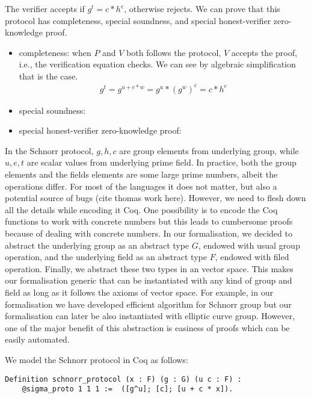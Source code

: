 \documentclass[conference,compsoc]{IEEEtran}
\begin{document}
The verifier accepts if $g^t = c * h^e$, otherwise rejects. We can prove that 
this protocol has completeness, special soundness, and special honest-verifier 
zero-knowledge proof. 


\begin{itemize}
  \item completeness: when $P$ and $V$ both follows the protocol, $V$ accepts the proof, i.e., 
  the verification equation checks. We can see by algebraic simplification that is the case.
    \begin{align*}
      g^t = g^{u + e * w} = g^u * (g^w)^e = c * h^e
    \end{align*}
  \item special soundness: 

  \item special honest-verifier zero-knowledge proof:
   
\end{itemize}


In the Schnorr protocol, $g, h, c$ are group elements from underlying group, while 
$u, e, t$ are scalar values from underlying prime field. In practice, 
both the group elements and the fields elements are some large prime numbers,
albeit the operations differ. For most of the languages it does not matter, 
but also a potential source of bugs (cite thomas work here). However, 
we need to flesh down all the details while encoding it Coq. One possibility is 
to encode the Coq functions to work with concrete numbers but this leads to 
cumbersome proofs because of dealing with concrete numbers. In our formalisation, 
we decided to abstract the underlying group as an abstract type $G$, endowed with 
usual group operation, and the underlying field as an abstract type $F$, endowed with 
filed operation. Finally, we abstract these two types in an vector space. This 
makes our formalisation generic that can be instantiated with 
any kind of group and field as long as it follows the axioms of 
vector space. For example, in our formalisation we have developed 
efficient algorithm for Schnorr group but our formalisation can 
later be also instantiated with elliptic curve group. However, 
one of the major benefit of this abstraction is easiness of proofs 
which can be easily automated. 


We model the Schnorr protocol in Coq as follows: 
 
\begin{lstlisting}[language=Coq]
  Definition schnorr_protocol (x : F) (g : G) (u c : F) : 
    @sigma_proto 1 1 1 :=  ([g^u]; [c]; [u + c * x]).
\end{lstlisting}
  
\end{document}
